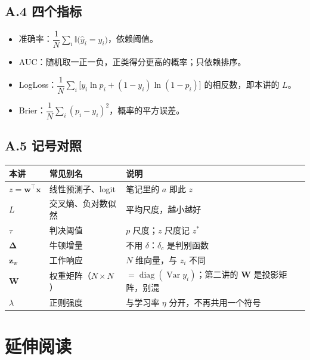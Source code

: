\documentclass[11pt,a4paper,fontset=windows,zihao=-4]{ctexart}
\newcommand{\bw}{\mathbf{w}}
\newcommand{\bx}{\mathbf{x}}
\newcommand{\bz}{\mathbf{z}}
\newcommand{\bW}{\mathbf{W}}
\newcommand{\bDelta}{\boldsymbol{\Delta}}
\newcommand{\tp}{^{\top}}
\DeclareMathOperator{\diag}{diag}
\DeclareMathOperator{\Var}{Var}
\newcommand{\tabhead}{\sffamily\bfseries\color{navy}}
\begin{document}
\subsection*{A.4 四个指标}
\begin{itemize}
  \item 准确率：$\dfrac{1}{N}\sum_i\mathbb{I}\bigl(\hat y_i=y_i\bigr)$，依赖阈值。
  \item AUC：随机取一正一负，正类得分更高的概率；只依赖排序。
  \item LogLoss：$\dfrac1N\sum_i\bigl[y_i\ln p_i+(1-y_i)\ln(1-p_i)\bigr]$ 的相反数，即本讲的 $L$。
  \item Brier：$\dfrac1N\sum_i(p_i-y_i)^2$，概率的平方误差。
\end{itemize}

\subsection*{A.5 记号对照}
\begin{center}
\small
\begin{tabular}{@{}lll@{}}
\toprule
\rowcolor{navy!7}
\tabhead 本讲 & \tabhead 常见别名 & \tabhead 说明\\
\midrule
$z=\bw\tp\bx$ & 线性预测子、logit & 笔记里的 $a$ 即此 $z$\\
$L$ & 交叉熵、负对数似然 & 平均尺度，越小越好\\
$\tau$ & 判决阈值 & $p$ 尺度；$z$ 尺度记 $z^{\ast}$\\
$\bDelta$ & 牛顿增量 & 不用 $\delta$：$\delta_c$ 是判别函数\\
$\bz_{\mathrm w}$ & 工作响应 & $N$ 维向量，与 $z_i$ 不同\\
$\bW$ & 权重矩阵（$N\times N$） & $=\diag(\Var y_i)$；第二讲的 $\bW$ 是投影矩阵，别混\\
$\lambda$ & 正则强度 & 与学习率 $\eta$ 分开，不再共用一个符号\\
\bottomrule
\end{tabular}
\end{center}

\section{延伸阅读}
\end{document}
